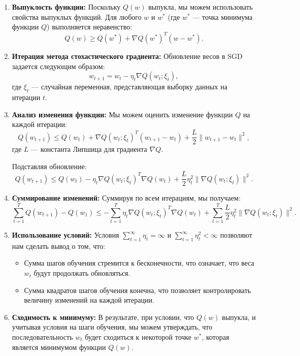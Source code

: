 \begin{enumerate}
    \item \textbf{Выпуклость функции:} Поскольку \( Q(w) \) выпукла, мы можем использовать свойства выпуклых функций. Для любого \( w \) и \( w^* \) (где \( w^* \) — точка минимума функции \( Q \)) выполняется неравенство:
    $$ Q(w) \geq Q(w^*) + \nabla Q(w^*)^T (w - w^*). $$

    \item \textbf{Итерация метода стохастического градиента:} Обновление весов в SGD задается следующим образом:
    $$ w_{t+1} = w_t - \eta_t \nabla Q(w_t; \xi_t), $$
    где \( \xi_t \) — случайная переменная, представляющая выборку данных на итерации \( t \).

    \item \textbf{Анализ изменения функции:} Мы можем оценить изменение функции \( Q \) на каждой итерации:
    $$ Q(w_{t+1}) \leq Q(w_t) + \nabla Q(w_t; \xi_t)^T (w_{t+1} - w_t) + \frac{L}{2} \|w_{t+1} - w_t\|^2, $$
    где \( L \) — константа Липшица для градиента \( \nabla Q \).

    Подставляя обновление:
    $$ Q(w_{t+1}) \leq Q(w_t) - \eta_t \nabla Q(w_t; \xi_t)^T \nabla Q(w_t) + \frac{L}{2} \eta_t^2 \|\nabla Q(w_t; \xi_t)\|^2. $$

    \item \textbf{Суммирование изменений:} Суммируя по всем итерациям, мы получаем:
    $$ \sum_{t=1}^{T} Q(w_{t+1}) - Q(w_1) \leq -\sum_{t=1}^{T} \eta_t \nabla Q(w_t; \xi_t)^T \nabla Q(w_t) + \sum_{t=1}^{T} \frac{L}{2} \eta_t^2 \|\nabla Q(w_t; \xi_t)\|^2. $$

    \item \textbf{Использование условий:} Условия \( \sum_{t=1}^{\infty} \eta_t = \infty \) и \( \sum_{t=1}^{\infty} \eta_t^2 < \infty \) позволяют нам сделать вывод о том, что:
    \begin{itemize}
        \item Сумма шагов обучения стремится к бесконечности, что означает, что веса \( w_t \) будут продолжать обновляться.
        \item Сумма квадратов шагов обучения конечна, что позволяет контролировать величину изменений на каждой итерации.
    \end{itemize}

    \item \textbf{Сходимость к минимуму:} В результате, при условии, что \( Q(w) \) выпукла, и учитывая условия на шаги обучения, мы можем утверждать, что последовательность \( w_t \) будет сходиться к некоторой точке \( w^* \), которая является минимумом функции \( Q(w) \).
\end{enumerate}


